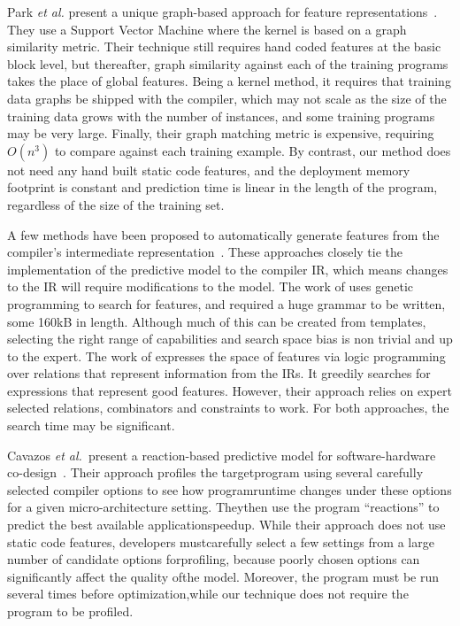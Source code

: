 Park \emph{et al.} present a unique graph-based approach for feature representations~\cite{Park2012}. They use a Support Vector Machine where the kernel is based on a graph similarity metric. Their technique still requires hand coded features at the basic block level, but thereafter, graph similarity against each of the training programs takes the place of global features. Being a kernel method, it requires that training data graphs be shipped with the compiler, which may not scale as the size of the training data grows with the number of instances, and some training programs may be very large. Finally, their graph matching metric is expensive, requiring $O(n^3)$ to compare against each training example. By contrast, our method does not need any hand built static code features, and the deployment memory footprint is constant and prediction time is linear in the length of the program, regardless of the size of the training set.

A few methods have been proposed to automatically generate features from the compiler's intermediate representation~\cite{Namolaru2010a,Leather2014}. These approaches closely tie the implementation of the predictive model to the compiler IR, which means changes to the IR will require modifications to the model. The work of \cite{Leather2014} uses genetic programming to search for features, and required a huge grammar to be written, some 160kB in length. Although much of this can be created from templates, selecting the right range of capabilities and search space bias is non trivial and up to the expert. The work of \cite{Namolaru2010a} expresses the space of features via logic programming over relations that represent information from the IRs. It greedily searches for expressions that represent good features. However, their approach relies on expert selected relations, combinators and constraints to work. For both approaches, the search time may be significant.

Cavazos \emph{et al.\ }present a reaction-based predictive model for software-hardware co-design~\cite{Cavazos2006}. Their approach profiles the targetprogram using several carefully selected compiler options to see how programruntime changes under these options for a given micro-architecture setting. Theythen use the program ``reactions'' to predict the best available applicationspeedup. While their approach does not use static code features, developers mustcarefully select a few settings from a large number of candidate options forprofiling, because poorly chosen options can significantly affect the quality ofthe model. Moreover, the program must be run several times before optimization,while our technique does not require the program to be profiled.

